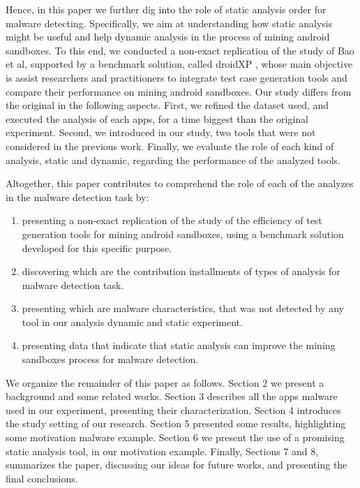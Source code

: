 Hence, in this paper we further dig into the role of static analysis order for malware detecting. Specifically, we aim at understanding how static analysis might be useful and help dynamic analysis in the process of mining android sandboxes. To this end, we conducted a non-exact replication of the study of Bao et al, supported by a benchmark solution, called droidXP \cite{dadroidxp}, whose main objective is assist researchers and practitioners to integrate test case generation tools and compare their performance on mining android sandboxes. Our study differs from the original in the following aspects. First, we refined the dataset used, and executed the analysis of each apps, for a time biggest than the original experiment. Second, we introduced in our study, two tools that were not considered in the previous work. Finally, we evaluate the role of each kind of analysis, static and dynamic, regarding the performance of the analyzed tools.

Altogether, this paper contributes to comprehend the role of each of the analyzes in the malware detection task by:

\begin{enumerate}[(1)]
 \item presenting a non-exact replication of the study of the efficiency of test generation tools for mining android sandboxes, using a benchmark solution developed for this specific purpose.
 
 \item discovering which are the contribution installments of types of analysis for malware detection task.
 
 \item presenting which are malware characteristics, that was not detected by any tool in our analysis dynamic and static experiment.
 
 \item presenting data that indicate that static analysis can improve the mining sandboxes process for malware detection.
 \end{enumerate}
 
We organize the remainder of this paper as follows. Section 2 we present a background and some related works. Section 3 describes all the apps malware used in our experiment, presenting their characterization. Section 4 introduces the study setting of our research. Section 5 presented some results, highlighting some motivation malware example. Section 6 we present the use of a promising static analysis tool, in our motivation example. Finally, Sections 7 and 8, summarizes the paper, discussing our ideas for future works, and presenting the final conclusions.

